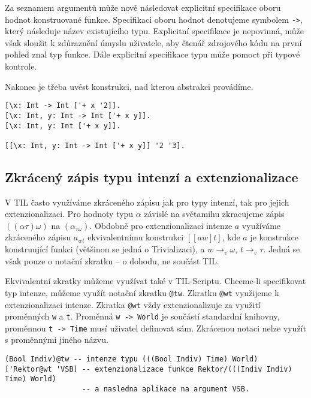 Za seznamem argumentů může nově následovat explicitní specifikace oboru hodnot konstruované funkce.
Specifikaci oboru hodnot denotujeme symbolem \lstinline{->}, který následuje název existujícího
typu. Explicitní specifikace je nepovinná, může však sloužit k zdůraznění úmyslu uživatele, aby
čtenář zdrojového kódu na první pohled znal typ funkce. Dále explicitní specifikace typu může
pomoct při typové kontrole.

Nakonec je třeba uvést konstrukci, nad kterou abstrakci provádíme.

\begin{lstlisting}[caption={Příklad využití Uzávěrů}]
[\x: Int -> Int ['+ x '2]].
[\x: Int, y: Int -> Int ['+ x y]].
[\x: Int, y: Int ['+ x y]].

[[\x: Int, y: Int -> Int ['+ x y]] '2 '3].
\end{lstlisting}

\subsection{Zkrácený zápis typu intenzí a extenzionalizace}

V TIL často využíváme zkráceného zápisu jak pro typy intenzí, tak pro jejich extenzionalizaci.
Pro hodnoty typu $\alpha$ závislé na světamihu zkracujeme zápis $((\alpha\tau)\omega)$
na $(\alpha_{\tau\omega})$. Obdobně pro extenzionalizaci intenze $a$ využíváme zkráceného zápisu
$a_{wt}$ ekvivalentnímu konstrukci $[[a w] t]$, kde $a$ je konstrukce konstruující funkci
(většinou se jedná o Trivializaci), a $w \rightarrow_v \omega$, $t \rightarrow_v \tau$. Jedná
se však pouze o notační zkratku -- o dohodu, ne součást TIL.

Ekvivalentní zkratky můžeme využívat také v TIL-Scriptu. Chceme-li specifikovat typ intenze, můžeme
využít notační zkratku \lstinline{@tw}. Zkratku \lstinline{@wt} využijeme k extenzionalizaci
intenze. Zkratka \lstinline{@wt} vždy extenzionalizuje za využití proměnných \lstinline{w} a
\lstinline{t}. Proměnná \lstinline{w -> World} je součástí standardní knihovny, proměnnou
\lstinline{t -> Time} musí uživatel definovat sám. Zkrácenou notaci nelze využít s proměnnými
jiného názvu.

\begin{lstlisting}[caption={Příklad využití zkrácené notace}]
(Bool Indiv)@tw -- intenze typu (((Bool Indiv) Time) World)
['Rektor@wt 'VSB] -- extenzionalizace funkce Rektor/(((Indiv Indiv) Time) World)
                  -- a nasledna aplikace na argument VSB.
\end{lstlisting}

